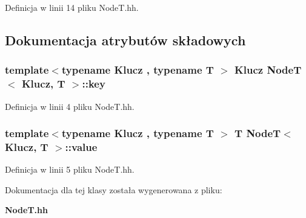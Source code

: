 Definicja w linii 14 pliku Node\-T.\-hh.



\subsection{Dokumentacja atrybutów składowych}
\subsubsection[{key}]{\setlength{\rightskip}{0pt plus 5cm}template$<$typename Klucz , typename T $>$ Klucz {\bf Node\-T}$<$ Klucz, T $>$\-::key\hspace{0.3cm}{\ttfamily [private]}}\label{class_node_t_a833d12f6ac9783f3ffd89609412aa3e5}


Definicja w linii 4 pliku Node\-T.\-hh.

\subsubsection[{value}]{\setlength{\rightskip}{0pt plus 5cm}template$<$typename Klucz , typename T $>$ T {\bf Node\-T}$<$ Klucz, T $>$\-::value\hspace{0.3cm}{\ttfamily [private]}}\label{class_node_t_aedff0d9091fdfdaf53988dc427c7ded3}


Definicja w linii 5 pliku Node\-T.\-hh.



Dokumentacja dla tej klasy została wygenerowana z pliku\-:\begin{DoxyCompactItemize}
\item 
{\bf Node\-T.\-hh}\end{DoxyCompactItemize}
